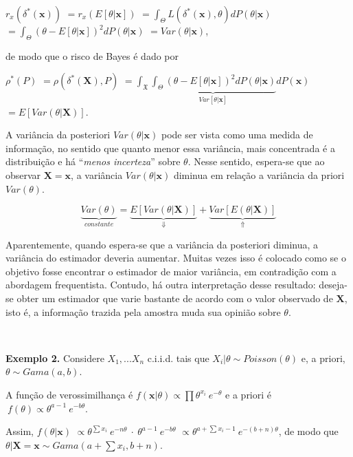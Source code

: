 \documentclass[
]{book}
\begin{document}
\(r_x\left(\delta^*(\boldsymbol x)\right)\) \(=r_x\left(E[\theta|\boldsymbol x]\right)\) \(=\displaystyle \int_\Theta L\left(\delta^*(\boldsymbol x),\theta\right)dP(\theta|\boldsymbol x)\) \(=\displaystyle \int_\Theta \left(\theta-E[\theta|\boldsymbol x]\right)^2 dP(\theta|\boldsymbol x)\) \(=Var(\theta|\boldsymbol x)\),

de modo que o risco de Bayes é dado por

\({\rho}^*\left(P\right)\) \(=\rho\left(\delta^*(\boldsymbol X),P\right)\) \(=\displaystyle \int_{\mathfrak{X}} \underbrace{ \int_{\Theta}(\theta-E[\theta|\boldsymbol{x}])^2dP(\theta|\boldsymbol{x})}_{Var[\theta|\boldsymbol{x}]}dP(\boldsymbol{x})\) \(=E\left[Var(\theta|\boldsymbol X)\right]\).

A variância da posteriori \(Var(\theta|\boldsymbol x)\) pode ser vista como uma medida de informação, no sentido que quanto menor essa variância, mais concentrada é a distribuição e há ``\emph{menos incerteza}'' sobre \(\theta\). Nesse sentido, espera-se que ao observar \(\boldsymbol X=\boldsymbol x\), a variância \(Var(\theta|\boldsymbol x)\) diminua em relação a variância da priori \(Var(\theta)\).

\[\underbrace{Var(\theta)}_{constante}=\underbrace{E\left[Var(\theta|\boldsymbol X)\right]}_{\boldsymbol \Downarrow}+\underbrace{Var\left[E(\theta|\boldsymbol X)\right]}_{\boldsymbol \Uparrow}\]

Aparentemente, quando espera-se que a variância da posteriori diminua, a variância do estimador deveria aumentar. Muitas vezes isso é colocado como se o objetivo fosse encontrar o estimador de maior variância, em contradição com a abordagem frequentista. Contudo, há outra interpretação desse resultado: deseja-se obter um estimador que varie bastante de acordo com o valor observado de \(\boldsymbol X\), isto é, a informação trazida pela amostra muda sua opinião sobre \(\theta\).

\(~\)

\textbf{Exemplo 2.} Considere \(X_1,...X_n\) c.i.i.d. tais que \(X_i|\theta\sim Poisson(\theta)\) e, a priori, \(\theta \sim Gama(a,b)\).

A função de verossimilhança é \(f(\boldsymbol x | \theta)\propto \prod {\theta}^{x_i}~{e}^{-\theta}\) e a priori é \(~f(\theta)\propto{\theta}^{a-1}~{e}^{-b\theta}\).

Assim, \(f(\theta | \boldsymbol x)\) \(\propto {\theta}^{\sum x_i}~{e}^{-n\theta} ~\cdot~ {\theta}^{a-1}~{e}^{-b\theta}\) \(\propto {\theta}^{a+\sum x_i-1}~{e}^{-(b+n)\theta}\), de modo que \(\theta|\boldsymbol X=\boldsymbol x\sim Gama\left(a+\sum x_i,b+n\right)\).
\end{document}
